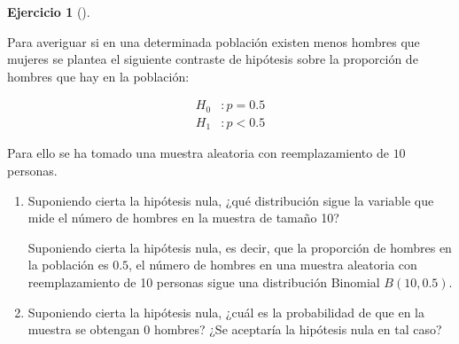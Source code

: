 \documentclass[
  a4paper,
]{scrreport}
\theoremstyle{definition}
\newtheorem{exercise}{Ejercicio}[chapter]
\theoremstyle{remark}
\begin{document}
\begin{exercise}[]\protect\hypertarget{exr-contraste-hipotesis-proporcion-hombres}{}\label{exr-contraste-hipotesis-proporcion-hombres}

Para averiguar si en una determinada población existen menos hombres que
mujeres se plantea el siguiente contraste de hipótesis sobre la
proporción de hombres que hay en la población:

\begin{align*}
H_0 &: p=0.5\\
H_1 &: p<0.5 
\end{align*}

Para ello se ha tomado una muestra aleatoria con reemplazamiento de
\(10\) personas.

\begin{enumerate}
\def\labelenumi{\alph{enumi}.}
\item
  Suponiendo cierta la hipótesis nula, ¿qué distribución sigue la
  variable que mide el número de hombres en la muestra de tamaño 10?

  \begin{tcolorbox}[enhanced jigsaw, coltitle=black, left=2mm, colback=white, leftrule=.75mm, toptitle=1mm, breakable, bottomrule=.15mm, titlerule=0mm, bottomtitle=1mm, title=\textcolor{quarto-callout-tip-color}{\faLightbulb}\hspace{0.5em}{Solución}, arc=.35mm, toprule=.15mm, rightrule=.15mm, colframe=quarto-callout-tip-color-frame, opacityback=0, colbacktitle=quarto-callout-tip-color!10!white, opacitybacktitle=0.6]

  Suponiendo cierta la hipótesis nula, es decir, que la proporción de
  hombres en la población es \(0.5\), el número de hombres en una
  muestra aleatoria con reemplazamiento de 10 personas sigue una
  distribución Binomial \(B(10, 0.5)\).

  \end{tcolorbox}
\item
  Suponiendo cierta la hipótesis nula, ¿cuál es la probabilidad de que
  en la muestra se obtengan 0 hombres? ¿Se aceptaría la hipótesis nula
  en tal caso?

  \begin{tcolorbox}[enhanced jigsaw, coltitle=black, left=2mm, colback=white, leftrule=.75mm, toptitle=1mm, breakable, bottomrule=.15mm, titlerule=0mm, bottomtitle=1mm, title=\textcolor{quarto-callout-tip-color}{\faLightbulb}\hspace{0.5em}{Solución}, arc=.35mm, toprule=.15mm, rightrule=.15mm, colframe=quarto-callout-tip-color-frame, opacityback=0, colbacktitle=quarto-callout-tip-color!10!white, opacitybacktitle=0.6]


\end{tcolorbox}
\end{enumerate}
\end{exercise}
\end{document}
